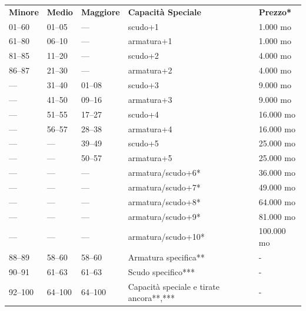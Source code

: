 \documentclass[a4paper,11pt,twoside,openany]{book}
\begin{document}
\begin{tabularx}{0.95\textwidth}{XXXXX}
	\toprule
	\textbf{Minore} & \textbf{Medio} & \textbf{Maggiore} & \textbf{Capacità Speciale}        & \textbf{Prezzo{*}}\\
	01--60          & 01--05         & ---               & scudo+1           & 1.000 mo\\
	61--80          & 06--10         & ---               & armatura+1        & 1.000 mo\\
	81--85          & 11--20         & ---               & scudo+2           & 4.000 mo\\
	86--87          & 21--30         & ---               & armatura+2        & 4.000 mo\\
	---             & 31--40         & 01--08            & scudo+3           & 9.000 mo\\
	---             & 41--50         & 09--16            & armatura+3        & 9.000 mo\\
	---             & 51--55         & 17--27            & scudo+4           & 16.000 mo\\
	---             & 56--57         & 28--38            & armatura+4        & 16.000 mo\\
	---             & ---            & 39--49            & scudo+5           & 25.000 mo\\
	---             & ---            & 50--57            & armatura+5        & 25.000 mo\\
	---             & ---            & ---               & armatura/scudo+6{*}               & 36.000 mo\\
	---             & ---            & ---               & armatura/scudo+7{*}               & 49.000 mo\\
	---             & ---            & ---               & armatura/scudo+8{*}               & 64.000 mo\\
	---             & ---            & ---               & armatura/scudo+9{*}               & 81.000 mo\\
	---             & ---            & ---               & armatura/scudo+10{*}              & 100.000 mo\\
	88--89          & 58--60         & 58--60            & Armatura specifica{*}{*}          & -\\
	90--91          & 61--63         & 61--63            & Scudo specifico{*}{*}{*}          & -\\
	92--100         & 64--100        & 64--100           & Capacità speciale e tirate ancora{*}{*},{*}{*}{*} & -\\
\end{tabularx}
\end{document}
